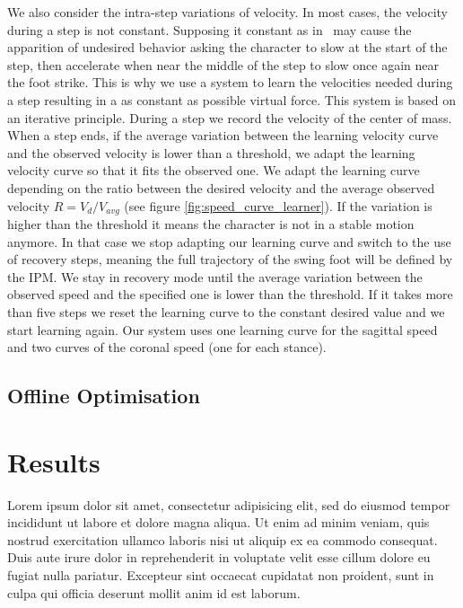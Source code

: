\documentclass[conference]{acmsiggraph}
\begin{document}
We also consider the intra-step variations of velocity. In most cases, the velocity during a step is not constant. Supposing it constant as in~\cite{coros2010generalized} may cause the apparition of undesired behavior asking the character to slow at the start of the step, then accelerate when near the middle of the step to slow once again near the foot strike. This is why we use a system to learn the velocities needed during a step resulting in a as constant as possible virtual force. This system is based on an iterative principle. During a step we record the velocity of the center of mass. When a step ends, if the average variation between the learning velocity curve and the observed velocity is lower than a threshold, we adapt the learning velocity curve so that it fits the observed one. We adapt the learning curve depending on the ratio between the desired velocity and the average observed velocity $R=V_d/V_{avg}$ (see figure \ref{fig:speed_curve_learner}). If the variation is higher than the threshold it means the character is not in a stable motion anymore. In that case we stop adapting our learning curve and switch to the use of recovery steps, meaning the full trajectory of the swing foot will be defined by the IPM. We stay in recovery mode until the average variation between the observed speed and the specified one is lower than the threshold. If it takes more than five steps we reset the learning curve to the constant desired value and we start learning again. Our system uses one learning curve for the sagittal speed and two curves of the coronal speed (one for each stance).

\subsection{Offline Optimisation}
\label{sec:optimisation}

\section{Results}
\label{sec:results}

Lorem ipsum dolor sit amet, consectetur adipisicing elit, sed do
eiusmod tempor incididunt ut labore et dolore magna aliqua. Ut enim ad
minim veniam, quis nostrud exercitation ullamco laboris nisi ut
aliquip ex ea commodo consequat. Duis aute irure dolor in
reprehenderit in voluptate velit esse cillum dolore eu fugiat nulla
pariatur. Excepteur sint occaecat cupidatat non proident, sunt in
culpa qui officia deserunt mollit anim id est laborum.
\end{document}
